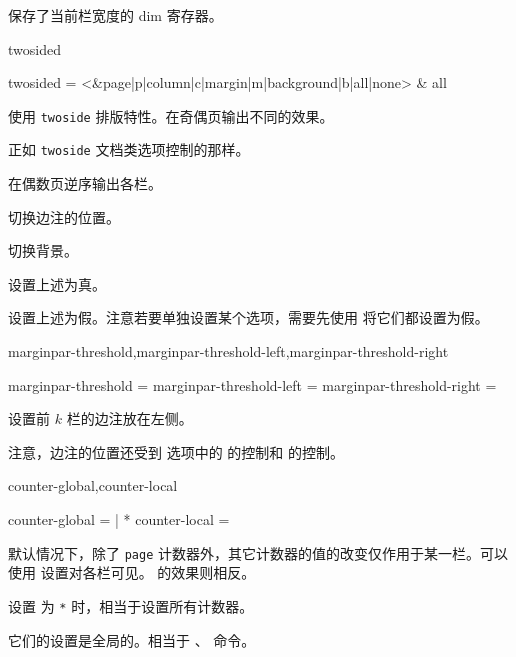 \documentclass[twoside]{book}
\begin{document}
\begin{function}[module=paracol]{\columnwidth}
保存了当前栏宽度的 dim 寄存器。
\end{function}

\begin{keyval}[path=paracol]{twosided}
  \begin{syntax}
    twosided = <&page|p|column|c|margin|m|background|b|all|none> & all 
  \end{syntax}
使用 \texttt{twoside} 排版特性。在奇偶页输出不同的效果。

\begin{description}[nosep]
  \item[\texttt{page|p}] 正如 \texttt{twoside} 文档类选项控制的那样。
  \item[\texttt{column|c}] 在偶数页逆序输出各栏。
  \item[\texttt{margin|m}] 切换边注的位置。
  \item[\texttt{background|b}] 切换背景。
  \item[\texttt{all}] 设置上述为真。
  \item[\texttt{none}] 设置上述为假。注意若要单独设置某个选项，需要先使用  将它们都设置为假。
\end{description}
\end{keyval}

\begin{keyval}[path=paracol]{marginpar-threshold,marginpar-threshold-left,marginpar-threshold-right}
  \begin{syntax}
    marginpar-threshold       =  
    marginpar-threshold-left  = 
    marginpar-threshold-right = 
  \end{syntax}
设置前 $k$ 栏的边注放在左侧。

注意，边注的位置还受到  选项中的  的控制和  的控制。
\end{keyval}

\begin{keyval}[path=paracol]{counter-global,counter-local}
  \begin{syntax}
    counter-global =  | *
    counter-local  = 
  \end{syntax}
默认情况下，除了 \texttt{page} 计数器外，其它计数器的值的改变仅作用于某一栏。可以使用  设置对各栏可见。 的效果则相反。

设置  为 \texttt{*} 时，相当于设置所有计数器。

它们的设置是全局的。相当于 、 命令。
\end{keyval}
\end{document}
